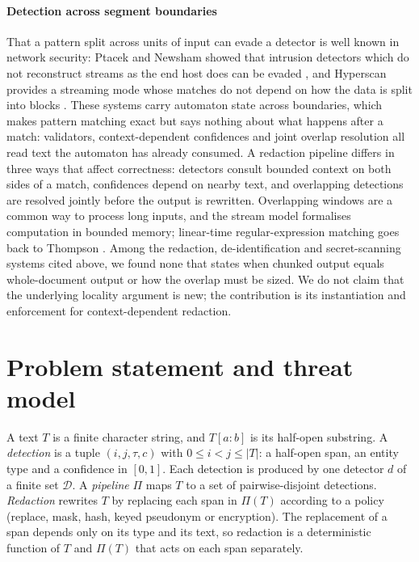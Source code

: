 \documentclass[pdflatex,sn-mathphys-num]{sn-jnl}
\theoremstyle{\ssThmStyle}
\theoremstyle{\ssDefStyle}
\begin{document}
\paragraph{Detection across segment boundaries}
That a pattern split across units of input can evade a detector is well known in network security: Ptacek and Newsham showed that intrusion detectors which do not reconstruct streams as the end host does can be evaded \cite{ptacek1998insertion}, and Hyperscan \cite{wang2019hyperscan} provides a streaming mode whose matches do not depend on how the data is split into blocks \cite{intel2019hyperscanintro}. These systems carry automaton state across boundaries, which makes pattern matching exact but says nothing about what happens after a match: validators, context-dependent confidences and joint overlap resolution all read text the automaton has already consumed. A redaction pipeline differs in three ways that affect correctness: detectors consult bounded context on both sides of a match, confidences depend on nearby text, and overlapping detections are resolved jointly before the output is rewritten. Overlapping windows are a common way to process long inputs, and the stream model \cite{muthukrishnan2005streams} formalises computation in bounded memory; linear-time regular-expression matching goes back to Thompson \cite{thompson1968regex}. Among the redaction, de-identification and secret-scanning systems cited above, we found none that states when chunked output equals whole-document output or how the overlap must be sized. We do not claim that the underlying locality argument is new; the contribution is its instantiation and enforcement for context-dependent redaction.

\section{Problem statement and threat model}\label{sec:problem}

\begin{definition}\label{def:det}
A text $T$ is a finite character string, and $T[a{:}b]$ is its half-open substring. A \emph{detection} is a tuple $(i, j, \tau, c)$ with $0 \le i < j \le |T|$: a half-open span, an entity type and a confidence in $[0,1]$. Each detection is produced by one detector $d$ of a finite set $\mathcal{D}$. A \emph{pipeline} $\Pi$ maps $T$ to a set of pairwise-disjoint detections. \emph{Redaction} rewrites $T$ by replacing each span in $\Pi(T)$ according to a policy (replace, mask, hash, keyed pseudonym or encryption). The replacement of a span depends only on its type and its text, so redaction is a deterministic function of $T$ and $\Pi(T)$ that acts on each span separately.
\end{definition}
\end{document}

